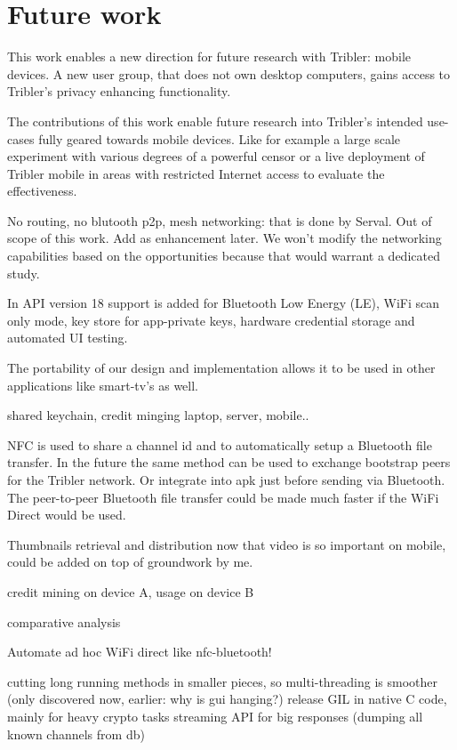 \section{Future work}\label{sec:future_work}

This work enables a new direction for future research with Tribler: mobile devices.
A new user group, that does not own desktop computers, gains access to Tribler's privacy enhancing functionality.

The contributions of this work enable future research into Tribler's intended use-cases fully geared towards mobile devices.
Like for example a large scale experiment with various degrees of a powerful censor or a live deployment of Tribler mobile in areas with restricted Internet access to evaluate the effectiveness.



No routing, no blutooth p2p, mesh networking: that is done by Serval. Out of scope of this work. Add as enhancement later.
We won't modify the networking capabilities based on the opportunities because that would warrant a dedicated study.


In API version 18 support is added for Bluetooth Low Energy (LE), WiFi scan only mode, key store for app-private keys, hardware credential storage and automated UI testing.


The portability of our design and implementation allows it to be used in other applications like smart-tv's as well.



shared keychain, credit minging laptop, server, mobile..


NFC is used to share a channel id and to automatically setup a Bluetooth file transfer.
In the future the same method can be used to exchange bootstrap peers for the Tribler network. Or integrate into apk just before sending via Bluetooth.
The peer-to-peer Bluetooth file transfer could be made much faster if the WiFi Direct would be used.


Thumbnails retrieval and distribution now that video is so important on mobile, could be added on top of groundwork by me.


credit mining on device A, usage on device B


comparative analysis

Automate ad hoc WiFi direct like nfc-bluetooth!

cutting long running methods in smaller pieces, so multi-threading is smoother (only discovered now, earlier: why is gui hanging?)
release GIL in native C code, mainly for heavy crypto tasks
streaming API for big responses (dumping all known channels from db)

